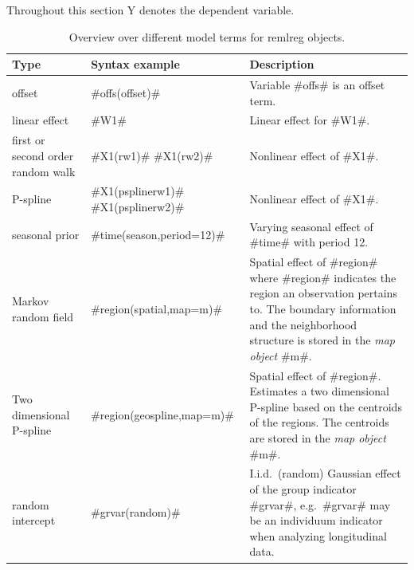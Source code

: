 Throughout this section Y denotes the dependent variable.

\begin{table}[ht] \footnotesize
\begin{center}
\begin{tabular}{|p{2.8cm}|p{3.6cm}|p{7.1cm}|}
\hline
{\bf Type} & {\bf Syntax example} & {\bf Description} \\
\hline \hline
offset & #offs(offset)#  & Variable #offs# is an offset term. \\
\hline
linear effect & #W1#  & Linear effect for #W1#. \\
\hline
first or second order random walk &   #X1(rw1)#  \newline  #X1(rw2)#  & Nonlinear effect of #X1#. \\
\hline
P-spline &  #X1(psplinerw1)#   \newline  #X1(psplinerw2)#  & Nonlinear effect of #X1#.  \\
\hline
seasonal prior & #time(season,period=12)# & Varying seasonal effect of #time# with period 12. \\
\hline Markov random \newline field &  #region(spatial,map=m)#  &
Spatial effect of #region# where #region# indicates the region an
observation pertains to. The boundary information and the
neighborhood structure is stored in the {\em map object}
#m#. \\
\hline Two dimensional \newline P-spline &
#region(geospline,map=m)# & Spatial effect of #region#. Estimates
a two dimensional P-spline
based on the centroids of the regions. The centroids are stored in the {\em map object} #m#. \\
\hline random intercept &  #grvar(random)# & I.i.d.~(random)
Gaussian effect of the group indicator #grvar#,
e.g.~#grvar# may be an individuum indicator when analyzing longitudinal data.  \\
\hline
\end{tabular}
{\em \caption {\label{remlregterms} Overview over different model
terms for remlreg objects.}}
\end{center}
\end{table}


